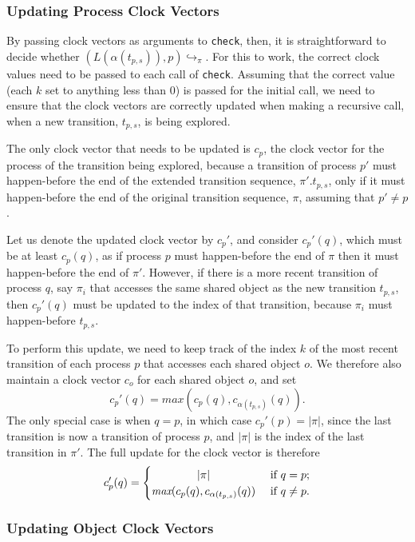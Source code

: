 \documentclass[12pt,a4paper,twoside,openright]{report}
\begin{document}
\subsubsection{Updating Process Clock Vectors}
By passing clock vectors as arguments to
\texttt{check}, then, it is straightforward
to decide whether
$(L(\alpha(t_{p,s})), p)\!\hookrightarrow_\pi$.
For this to work, the correct clock values need
to be passed to each call of \texttt{check}.
Assuming that the correct value (each $k$
set to anything less than 0) is passed for
the initial call, we need to ensure that the
clock vectors are correctly updated when
making a recursive call, when a new
transition, $t_{p,s}$, is being explored.

The only clock vector that needs to be updated
is $c_p$, the clock vector for the process
of the transition being explored, because
a transition of process $p'$ must happen-before
the end of the extended transition
sequence, $\pi'.t_{p,s}$,
only if it must happen-before the end
of the original transition sequence,
$\pi$, assuming that $p' \neq p$.

Let us denote the updated clock vector
by $c_p'$, and consider $c_p'(q)$, which
must be at least $c_p(q)$, as if process
$p$ must happen-before the end of $\pi$
then it must happen-before the end of $\pi'$.
However, if there is a more recent transition
of process $q$, say $\pi_i$
that accesses the same shared
object as the new transition $t_{p,s}$, then
$c_p'(q)$ must be updated to the index of
that transition, because $\pi_i$ must
happen-before $t_{p,s}$.

To perform this update, we need to keep
track of the index $k$ of the most recent
transition of each process $p$ that
accesses each shared object $o$. We therefore
also maintain a clock vector $c_o$ for each
shared object $o$, and set
\[ c_p'(q) =\textit{max}(c_p(q),
		c_{\alpha(t_{p,s})}(q)).\]
The only special case is when $q = p$,
in which case $c_p'(p) = |\pi|$, since
the last transition is now a transition of
process $p$, and $|\pi|$ is the index
of the last transition in $\pi'$. The
full update for the clock vector is therefore
\[ c_p'(q) =
\begin{cases}
	\hfill |\pi| \hfill & \text{ if } q = p; \\
	\hfill \textit{max}(c_p(q),
		c_{\alpha(t_{p,s})}(q))
		\hfill & \text{ if } q \neq p.
\end{cases}\]


\subsubsection{Updating Object Clock Vectors}
\end{document}

